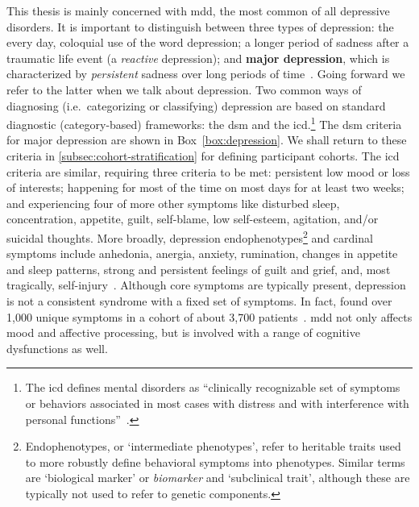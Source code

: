 This thesis is mainly concerned with \gls{mdd}, the most common of all depressive disorders.
It is important to distinguish between three types of depression: the every day, coloquial use of the word depression; a longer period of sadness after a traumatic life event (a \emph{reactive} depression); and \textbf{major depression}, which is characterized by \emph{persistent} sadness over long periods of time~\parencite{Otte2016}.
Going forward we refer to the latter when we talk about depression.
Two common ways of diagnosing (i.e.~categorizing or classifying) depression are based on standard diagnostic (category-based) frameworks: the \gls{dsm} and the \gls{icd}.\footnote{The \gls{icd} defines mental disorders as ``clinically recognizable set of symptoms or behaviors associated in most cases with distress and with interference with personal functions''~\parencite{WHO1992}.}
The \gls{dsm} criteria for major depression are shown in Box~\ref{box:depression}.
We shall return to these criteria in \cref{subsec:cohort-stratification} for defining participant cohorts.
The \gls{icd} criteria are similar, requiring three criteria to be met: persistent low mood or loss of interests; happening for most of the time on most days for at least two weeks; and experiencing four of more other symptoms like disturbed sleep, concentration, appetite, guilt, self-blame, low self-esteem, agitation, and/or suicidal thoughts.
More broadly, depression endophenotypes\footnote{Endophenotypes, or `intermediate phenotypes', refer to heritable traits used to more robustly define behavioral symptoms into phenotypes. Similar terms are `biological marker' or \emph{biomarker} and `subclinical trait', although these are typically not used to refer to genetic components.} and cardinal symptoms include anhedonia, anergia, anxiety, rumination, changes in appetite and sleep patterns, strong and persistent feelings of guilt and grief, and, most tragically, self-injury~\parencite{Goldstein2014, Pizzagalli2014}.
Although core symptoms are typically present, depression is not a consistent syndrome with a fixed set of symptoms.
In fact, \textcite{Fried2015} found over 1,000 unique symptoms in a cohort of about 3,700 patients~\parencite[see also][]{Fried2015b}.
\Gls{mdd} not only affects mood and affective processing, but is involved with a range of cognitive dysfunctions as well.


